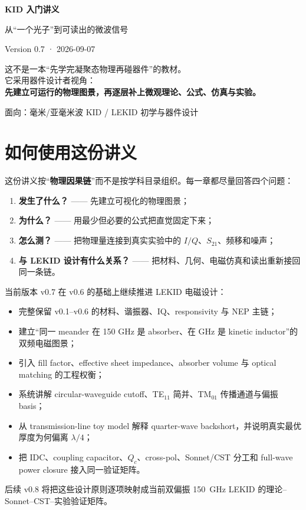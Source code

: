 \documentclass[11pt,a4paper,openany]{ctexrep}
\newcommand{\Stwentyone}{S_{21}}
\begin{document}
\begin{titlepage}
\centering
\vspace*{2.2cm}
{\fontsize{30}{38}\selectfont\bfseries\color{KidDark} KID 入门讲义}\par
\vspace{0.5cm}
{\Large\color{KidBlue} 从“一个光子”到可读出的微波信号}\par
\vspace{1.4cm}
{\large Version 0.7 · 2026-09-07}\par
\vfill
\begin{tcolorbox}[width=0.88\textwidth,colback=KidGray,colframe=KidBlue!55,arc=3mm]
\centering
\large
这不是一本“先学完凝聚态物理再碰器件”的教材。\\[0.5em]
它采用器件设计者视角：\\[0.3em]
\textbf{先建立可运行的物理图景，再逐层补上微观理论、公式、仿真与实验。}
\end{tcolorbox}
\vfill
{\large 面向：毫米/亚毫米波 KID / LEKID 初学与器件设计}\par
\end{titlepage}

\tableofcontents
\clearpage

\chapter*{如何使用这份讲义}
这份讲义按“\textbf{物理因果链}”而不是按学科目录组织。每一章都尽量回答四个问题：
\begin{enumerate}
  \item \textbf{发生了什么？} —— 先建立可视化的物理图景；
  \item \textbf{为什么？} —— 用最少但必要的公式把直觉固定下来；
  \item \textbf{怎么测？} —— 把物理量连接到真实实验中的 $I/Q$、$\Stwentyone$、频移和噪声；
  \item \textbf{与 LEKID 设计有什么关系？} —— 把材料、几何、电磁仿真和读出重新接回同一条链。
\end{enumerate}

当前版本 v0.7 在 v0.6 的基础上继续推进 LEKID 电磁设计：
\begin{itemize}
  \item 完整保留 v0.1--v0.6 的材料、谐振器、IQ、responsivity 与 NEP 主链；
  \item 建立“同一 meander 在 150 GHz 是 absorber、在 GHz 是 kinetic inductor”的双频电磁图景；
  \item 引入 fill factor、effective sheet impedance、absorber volume 与 optical matching 的工程权衡；
  \item 系统讲解 circular-waveguide cutoff、TE$_{11}$ 简并、TM$_{01}$ 传播通道与偏振 basis；
  \item 从 transmission-line toy model 解释 quarter-wave backshort，并说明真实最优厚度为何偏离 $\lambda/4$；
  \item 把 IDC、coupling capacitor、$Q_c$、cross-pol、Sonnet/CST 分工和 full-wave power closure 接入同一验证矩阵。
\end{itemize}
后续 v0.8 将把这些设计原则逐项映射成当前双偏振 \SI{150}{GHz} LEKID 的理论--Sonnet--CST--实验验证矩阵。
\end{document}
